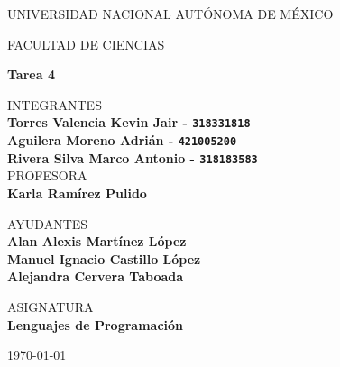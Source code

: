 \documentclass{article}
\begin{document}
	\begin{center}
	\vspace{0.8cm}
	\LARGE
	UNIVERSIDAD NACIONAL AUTÓNOMA DE MÉXICO

	\vspace{0.7cm}
	\LARGE
	FACULTAD DE CIENCIAS

	\vspace{0.8 cm}
	\Large
	\textbf{Tarea 4}

	\vspace{0.8 cm}
	\normalsize
	INTEGRANTES \\
	\vspace{.2cm}
	\large
	\textbf{Torres Valencia Kevin Jair - \texttt{318331818}}\\
	\textbf{Aguilera Moreno Adrián - \texttt{421005200}}\\
	\textbf{Rivera Silva Marco Antonio - \texttt{318183583}}\\

	\vspace{1 cm}
	\normalsize
	PROFESORA \\
	\vspace{.2cm}
	\large
	\textbf{Karla Ramírez Pulido}

	\vspace{1 cm}
	AYUDANTES \\
	\vspace{.2cm}
	\large
	\textbf{Alan Alexis Martínez López}\\
	\textbf{Manuel Ignacio Castillo López}\\
	\textbf{Alejandra Cervera Taboada}
	\vspace{1.3cm}

	\normalsize
	ASIGNATURA \\
	\vspace{.2cm}
	\large
	\textbf{Lenguajes de Programación}

	\vspace{1 cm}
	\today
	\end{center}

	\newpage
	
\end{document}
